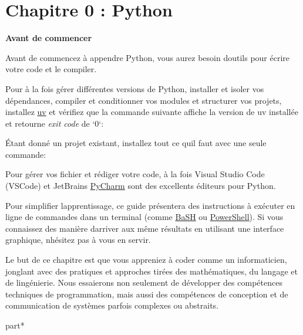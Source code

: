 \hypertarget{chapitre-0-python}{%
\section{Chapitre 0 : Python}\label{chapitre-0-python}}

\textbf{Avant de commencer}

Avant de commencez à appendre Python, vous aurez besoin
d\textquotesingle outils pour écrire votre code et le compiler.

Pour à la fois gérer différentes versions de Python, installer et isoler
vos dépendances, compiler et conditionner vos modules et structurer vos
projets, installez \href{}{uv} et vérifiez que la commande suivante
affiche la version de {uv} installée et retourne \emph{exit code} de
`0`:

\begin{Shaded}
\begin{Highlighting}[]
\end{Highlighting}
\end{Shaded}

Étant donné un projet existant, installez tout ce qu\textquotesingle il
faut avec une seule commande:

\begin{Shaded}
\begin{Highlighting}[]
\end{Highlighting}
\end{Shaded}

Pour gérer vos fichier et rédiger votre code, à la fois {Visual Studio
Code} (VSCode) et JetBrains \href{}{PyCharm} sont des excellents
éditeurs pour Python.

Pour simplifier l\textquotesingle apprentissage, ce guide présentera des
instructions à exécuter en ligne de commandes dans un terminal (comme
\href{}{BaSH} ou \href{}{PowerShell}). Si vous connaissez des manière
d\textquotesingle arriver aux même résultats en utilisant une interface
graphique, n\textquotesingle hésitez pas à vous en servir.

Le but de ce chapitre est que vous appreniez à coder comme un
informaticien, jonglant avec des pratiques et approches tirées des
mathématiques, du langage et de l\textquotesingle ingénierie. Nous
essaierons non seulement de développer des compétences techniques de
programmation, mais aussi des compétences de conception et de
communication de systèmes parfois complexes ou abstraits.

part*
